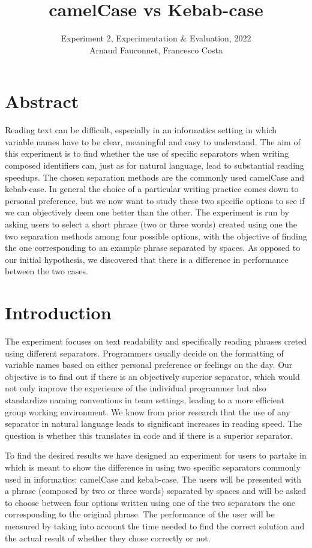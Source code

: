 \documentclass{article}
\title{camelCase vs Kebab-case}
\author{Experiment 2, Experimentation \& Evaluation, 2022\\Arnaud Fauconnet,
	Francesco Costa}
\date{}
\begin{document}
\maketitle
\tableofcontents

\section*{Abstract}
Reading text can be difficult, especially in an informatics setting in which variable names have to be clear, meaningful and 
easy to understand. The aim of this experiment is to find whether the use of specific separators when writing composed identifiers 
can, just as for natural language, lead to substantial reading speedups. The chosen separation methods are the commonly used camelCase and 
kebab-case. In general the choice of a particular writing practice comes down to personal preference, but we now want to study these two 
specific options to see if we can objectively deem one better than the other. The experiment is run by asking users to select a short phrase (two or three words) 
created using one the two separation methods among four possible options, with the objective of finding the one corresponding to an example phrase 
separated by spaces. As opposed to our initial hypothesis, we discovered that there is a difference in performance between the two cases.

\newpage 
\section{Introduction}
The experiment focuses on text readability and specifically reading phrases creted using different separators. Programmers usually decide on the formatting of 
variable names based on either personal preference or feelings on the day. Our objective is to find out if there is an objectively superior separator, which would 
not only improve the experience of the individual programmer but also standardize naming conventions in team settings, leading to a more 
efficient group working environment.
We know from prior research that the use of any separator in natural language leads to significant increases in reading speed. The question is whether this translates in 
code and if there is a superior separator. 

To find the desired results we have designed an experiment for users to partake in which is meant to show the difference in using two specific separators commonly 
used in informatics: camelCase and kebab-case. The users will be presented with a phrase (composed by two or three words) separated by spaces and will be asked to choose between four options 
written using one of the two separators the one corresponding to the original phrase. The performance of the user will be measured by taking into account the time needed to 
find the correct solution and the actual result of whether they chose correctly or not.
\end{document}
